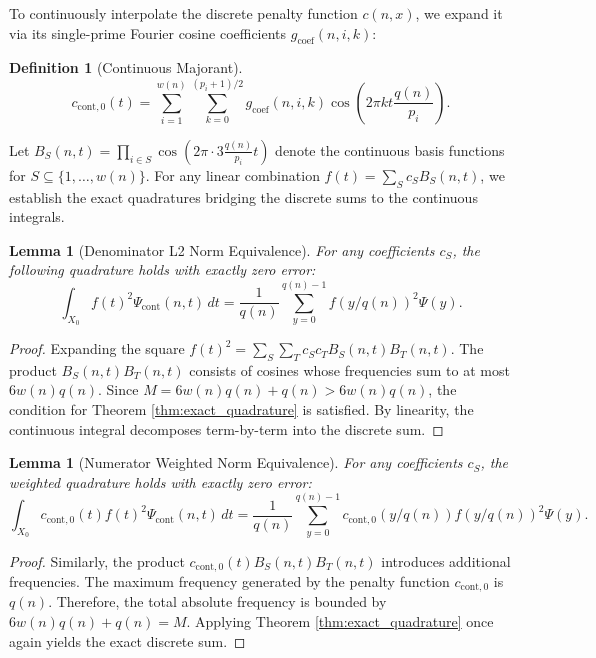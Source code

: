\documentclass{aomart}
\newtheorem{lemma}[theorem]{Lemma}
\theoremstyle{definition}
\newtheorem{definition}[theorem]{Definition}
\begin{document}
To continuously interpolate the discrete penalty function $c(n, x)$, we expand it via its
single-prime Fourier cosine coefficients $g_{\text{coef}}(n, i, k)$:
\begin{definition}[Continuous Majorant]
\[ c_{\text{cont}, 0}(t) = \sum_{i=1}^{w(n)} \sum_{k=0}^{(p_i+1)/2} g_{\text{coef}}(n, i, k) \cos\left( 2\pi k t \frac{q(n)}{p_i} \right). \]
\end{definition}

Let $B_S(n, t) = \prod_{i \in S} \cos(2\pi \cdot 3 \frac{q(n)}{p_i} t)$ denote the continuous basis
functions for $S \subseteq \{1, \dots, w(n)\}$. For any linear combination
$f(t) = \sum_S c_S B_S(n, t)$, we establish the exact quadratures bridging the discrete sums to the
continuous integrals.

\begin{lemma}[Denominator L2 Norm Equivalence] \label{lem:denominator_quad}
For any coefficients $c_S$, the following quadrature holds with exactly zero error:
\[ \int_{X_0} f(t)^2 \Psi_{\text{cont}}(n, t) \, dt = \frac{1}{q(n)} \sum_{y=0}^{q(n)-1} f(y/q(n))^2 \Psi(y). \]
\end{lemma}
\begin{proof}
Expanding the square $f(t)^2 = \sum_S \sum_T c_S c_T B_S(n, t) B_T(n, t)$. The product
$B_S(n, t) B_T(n, t)$ consists of cosines whose frequencies sum to at most $6w(n)q(n)$. Since
$M = 6w(n)q(n) + q(n) > 6w(n)q(n)$, the condition for Theorem
\ref{thm:exact_quadrature} is satisfied. By linearity, the continuous integral decomposes
term-by-term into the discrete sum.
\end{proof}

\begin{lemma}[Numerator Weighted Norm Equivalence] \label{lem:numerator_quad}
For any coefficients $c_S$, the weighted quadrature holds with exactly zero error:
\[ \int_{X_0} c_{\text{cont}, 0}(t) f(t)^2 \Psi_{\text{cont}}(n, t) \, dt = \frac{1}{q(n)} \sum_{y=0}^{q(n)-1} c_{\text{cont}, 0}(y/q(n)) f(y/q(n))^2 \Psi(y). \]
\end{lemma}
\begin{proof}
Similarly, the product $c_{\text{cont}, 0}(t) B_S(n, t) B_T(n, t)$ introduces additional
frequencies. The maximum frequency generated by the penalty function $c_{\text{cont}, 0}$ is
$q(n)$. Therefore, the total absolute frequency is bounded by $6w(n)q(n) + q(n) = M$.
Applying Theorem \ref{thm:exact_quadrature} once again yields the exact discrete sum.
\end{proof}
\end{document}
